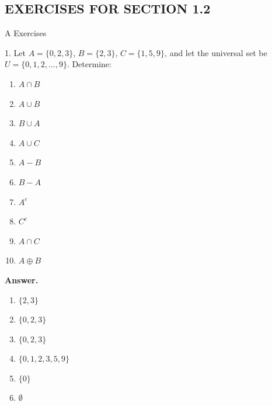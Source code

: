 \documentclass[10pt,]{book}
\theoremstyle{plain}
\theoremstyle{definition}
\theoremstyle{definition}
\theoremstyle{definition}
\theoremstyle{definition}
\begin{document}
\subsection[EXERCISES FOR SECTION 1.2 ]{EXERCISES FOR SECTION 1.2 }\label{exercises-1.2}
\hypertarget{exercisegroup-3}{}\typeout{************************************************}
\typeout{************************************************}
A Exercises%
\begin{exercisegroup}
\item[1.]\hypertarget{exercise-7}{} Let \(A = \{0, 2, 3\}\), \(B = \{2, 3\}\), \(C = \{1, 5, 9\}\), and let the universal set be \(U = \{0, 1, 2, . . . , 9\}\). Determine: %
\par
\leavevmode%
\begin{multicols}{3}
\begin{enumerate}[label=\alph*]
\item\hypertarget{li-76}{}  \(A \cap  B\)  %
\item\hypertarget{li-77}{}  \(A \cup  B\)%
\item\hypertarget{li-78}{}  \(B \cup  A\)   %
\item\hypertarget{li-79}{}  \(A \cup  C\) %
\item\hypertarget{li-80}{}  \(A - B\)%
\item\hypertarget{li-81}{}  \(B - A\)%
\item\hypertarget{li-82}{}   \(A^c\) %
\item\hypertarget{li-83}{}   \(C^c\)%
\item\hypertarget{li-84}{}  \(A\cap C\)%
\item\hypertarget{li-85}{}   \(A\oplus B\) %
\end{enumerate}
\end{multicols}
%
\par\smallskip
\par\smallskip
\noindent\textbf{Answer.}\hypertarget{answer-4}{}\quad
\leavevmode%
\begin{multicols}{3}
\begin{enumerate}[label=\alph*]
\item\hypertarget{li-86}{} \(\{2,3\}\)%
\item\hypertarget{li-87}{} \(\{0,2,3\}\)%
\item\hypertarget{li-88}{} \(\{0,2,3\}\)%
\item\hypertarget{li-89}{}\(\{0,1,2,3,5,9\}\)%
\item\hypertarget{li-90}{}\(\{0\}\) %
\item\hypertarget{li-91}{} \(\emptyset\) %

\end{enumerate}
\end{multicols}
\end{exercisegroup}
\end{document}

